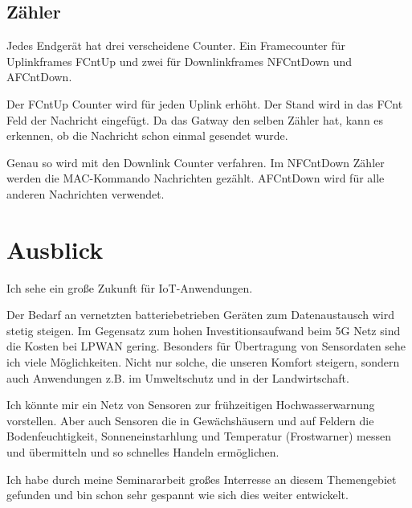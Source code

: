 \documentclass[a4paper, 12pt]{article}
\begin{document}
        \subsection{Zähler}\label{sec:Zaehler}
            Jedes Endgerät hat drei verscheidene Counter. Ein Framecounter für Uplinkframes FCntUp und zwei für 
            Downlinkframes NFCntDown und AFCntDown. 

            Der FCntUp Counter wird für jeden Uplink erhöht. Der Stand wird in das FCnt Feld der 
            Nachricht eingefügt. Da das Gatway den selben Zähler hat, kann es erkennen, ob die Nachricht schon einmal 
            gesendet wurde.

            Genau so wird mit den Downlink Counter verfahren. Im NFCntDown Zähler werden die 
            MAC-Kommando Nachrichten gezählt. AFCntDown wird für alle anderen Nachrichten verwendet.
            \cite[S.22 ff]{LoRaSecur}

    \section{Ausblick}
        Ich sehe ein große Zukunft für IoT-Anwendungen.
        
        Der Bedarf an vernetzten batteriebetrieben Geräten zum Datenaustausch wird stetig steigen. Im Gegensatz zum hohen
        Investitionsaufwand beim 5G Netz sind die Kosten bei LPWAN gering. Besonders für Übertragung von Sensordaten 
        sehe ich viele Möglichkeiten. Nicht nur solche, die unseren Komfort steigern, sondern auch 
        Anwendungen z.B. im Umweltschutz und in der Landwirtschaft.

        Ich könnte mir ein Netz von Sensoren zur frühzeitigen Hochwasserwarnung vorstellen. Aber auch Sensoren 
        die in Gewächshäusern und auf Feldern die Bodenfeuchtigkeit, Sonneneinstarhlung und Temperatur (Frostwarner) messen
        und übermitteln und so schnelles Handeln ermöglichen.

        Ich habe durch meine Seminararbeit großes Interresse an diesem Themengebiet gefunden und bin schon 
        sehr gespannt wie sich dies weiter entwickelt.


      

    \newpage
    
    
\end{document}

